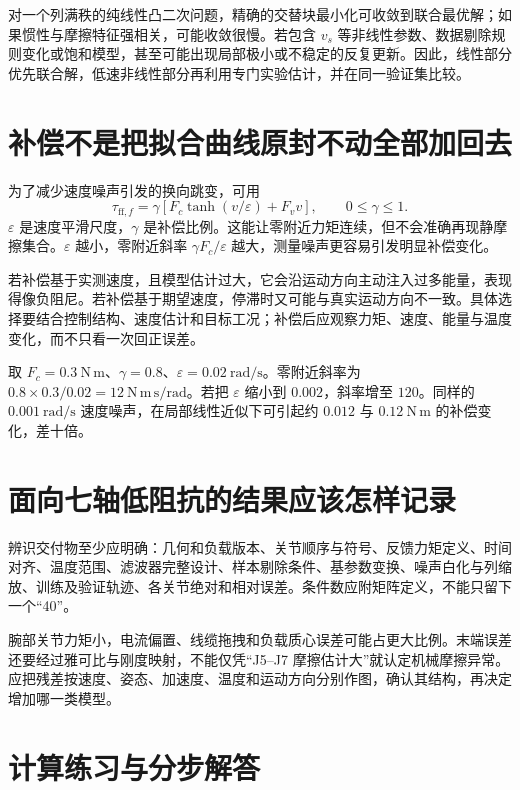 对一个列满秩的纯线性凸二次问题，精确的交替块最小化可收敛到联合最优解；如果惯性与摩擦特征强相关，可能收敛很慢。若包含 $v_s$ 等非线性参数、数据剔除规则变化或饱和模型，甚至可能出现局部极小或不稳定的反复更新。因此，线性部分优先联合解，低速非线性部分再利用专门实验估计，并在同一验证集比较。

\section{补偿不是把拟合曲线原封不动全部加回去}
为了减少速度噪声引发的换向跳变，可用
\[
 \tau_{\mathrm{ff},f}=\gamma\left[F_c\tanh(v/\varepsilon)+F_vv\right],\qquad0\le\gamma\le1.
\]
$\varepsilon$ 是速度平滑尺度，$\gamma$ 是补偿比例。这能让零附近力矩连续，但不会准确再现静摩擦集合。$\varepsilon$ 越小，零附近斜率 $\gamma F_c/\varepsilon$ 越大，测量噪声更容易引发明显补偿变化。

若补偿基于实测速度，且模型估计过大，它会沿运动方向主动注入过多能量，表现得像负阻尼。若补偿基于期望速度，停滞时又可能与真实运动方向不一致。具体选择要结合控制结构、速度估计和目标工况；补偿后应观察力矩、速度、能量与温度变化，而不只看一次回正误差。

\begin{examplebox}[算例 9F 平滑尺度决定零附近的敏感度]
取 $F_c=0.3\ \mathrm{N\,m}$、$\gamma=0.8$、$\varepsilon=0.02\ \mathrm{rad/s}$。零附近斜率为 $0.8\times0.3/0.02=12\ \mathrm{N\,m\,s/rad}$。若把 $\varepsilon$ 缩小到 $0.002$，斜率增至 $120$。同样的 $0.001\ \mathrm{rad/s}$ 速度噪声，在局部线性近似下可引起约 $0.012$ 与 $0.12\ \mathrm{N\,m}$ 的补偿变化，差十倍。
\end{examplebox}

\section{面向七轴低阻抗的结果应该怎样记录}
辨识交付物至少应明确：几何和负载版本、关节顺序与符号、反馈力矩定义、时间对齐、温度范围、滤波器完整设计、样本剔除条件、基参数变换、噪声白化与列缩放、训练及验证轨迹、各关节绝对和相对误差。条件数应附矩阵定义，不能只留下一个“40”。

腕部关节力矩小，电流偏置、线缆拖拽和负载质心误差可能占更大比例。末端误差还要经过雅可比与刚度映射，不能仅凭“J5--J7 摩擦估计大”就认定机械摩擦异常。应把残差按速度、姿态、加速度、温度和运动方向分别作图，确认其结构，再决定增加哪一类模型。

\section{计算练习与分步解答}
